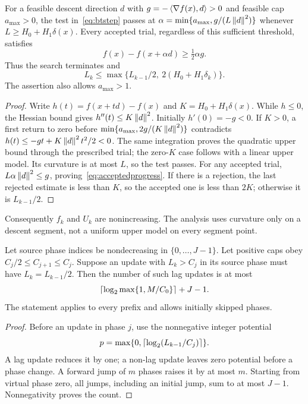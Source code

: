 \begin{lemma}\label{lem:local}
For a feasible descent direction $d$ with $g=-\left\langle\nabla f(x),d\right\rangle>0$
and feasible cap $a_{\max}>0$, the test in~\eqref{eq:btstep} passes
at $\alpha=\min\{a_{\max},g/(L\left\|d\right\|^2)\}$ whenever
$L\ge H_0+H_1\delta(x)$. Every accepted trial, regardless of this
sufficient threshold, satisfies
\begin{equation}\label{eq:acceptedprogress}
 f(x)-f(x+\alpha d)\ge\tfrac12\alpha g.
\end{equation}
Thus the search terminates and
\begin{equation}\label{eq:localenvelope}
 L_k\le\max\{L_{k-1}/2,\ 2(H_0+H_1\delta_k)\}.
\end{equation}
The assertion also allows $a_{\max}>1$.
\end{lemma}
\begin{proof}
Write $h(t)=f(x+td)-f(x)$ and $K=H_0+H_1\delta(x)$.
While $h\le0$, the Hessian bound gives $h''(t)\le K\left\|d\right\|^2$.
Initially $h'(0)=-g<0$. If $K>0$, a first return to zero before
$\min\{a_{\max},2g/(K\left\|d\right\|^2)\}$ contradicts
$h(t)\le-gt+K\left\|d\right\|^2t^2/2<0$. The same integration proves
the quadratic upper bound through the prescribed trial; the zero-$K$
case follows with a linear upper model. Its curvature is at most $L$,
so the test passes. For any accepted trial,
$L\alpha\left\|d\right\|^2\le g$, proving~\eqref{eq:acceptedprogress}.
If there is a rejection, the last rejected estimate is less than $K$,
so the accepted one is less than $2K$; otherwise it is $L_{k-1}/2$.
\end{proof}

Consequently $f_k$ and $U_k$ are nonincreasing. The analysis uses
curvature only on a descent segment, not a uniform upper model on
every segment point.

\begin{lemma}\label{lem:lag}
Let source phase indices be nondecreasing in $\{0,\ldots,J-1\}$.
Let positive caps obey $C_j/2\le C_{j+1}\le C_j$.
Suppose an update with $L_k>C_j$ in its source phase must have
$L_k=L_{k-1}/2$. Then the number of such lag updates is at most
\[
 \left\lceil\log_2\max\{1,M/C_0\}\right\rceil+J-1.
\]
The statement applies to every prefix and allows initially skipped phases.
\end{lemma}
\begin{proof}
Before an update in phase $j$, use the nonnegative integer potential
\[
 p=\max\{0,\left\lceil\log_2(L_{k-1}/C_j)\right\rceil\}.
\]
A lag update reduces it by one; a non-lag update leaves zero potential
before a phase change. A forward jump of $m$ phases raises it by at
most $m$. Starting from virtual phase zero, all jumps, including an
initial jump, sum to at most $J-1$. Nonnegativity proves the count.
\end{proof}


